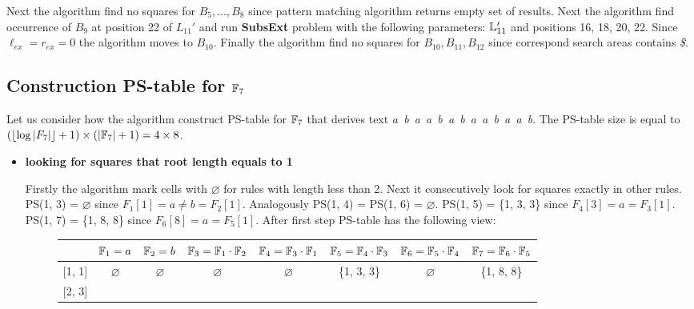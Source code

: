 ﻿\documentclass[11pt]{article}
\begin{document}
\begin{appendix}
\begin{itemize}
  \LeechWordPartitionComplex

  Next the algorithm find no squares for $B_5, \dots, B_8$ since pattern matching algorithm returns empty set of
  results. Next the algorithm find occurrence of $B_9$ at position 22 of $L_{11}'$ and run \textbf{SubsExt}
  problem with the following parameters: $\mathbb{L}_{11}'$ and positions 16, 18, 20, 22. Since $\ell_{ex} = r_{ex} = 0$ the
  algorithm moves to $B_{10}$. Finally the algorithm find no squares for $B_{10}, B_{11}, B_{12}$ since correspond
  search areas contains \emph{\$}.
\end{itemize}

\subsection{Construction PS-table for $\mathbb{F}_7$}

Let us consider how the algorithm construct PS-table for $\mathbb{F}_7$ that derives text \emph{a~b~a~a~b~a~b~a~a~b~a~a~b}.
The PS-table size is equal to $(\lfloor\log |F_7|\rfloor+1)\times (|\mathbb{F}_7|+1) = 4 \times 8$. 

\begin{itemize}
  \item \textbf{looking for squares that root length equals to 1}
  
  Firstly the algorithm mark cells with $\varnothing$ for rules with length less than 2. Next it consecutively look for
  squares exactly in other rules. PS(1, 3) = $\varnothing$ since $F_1[1] = a \neq b = F_2[1]$. Analogously PS(1, 4) =
  PS(1, 6) = $\varnothing$. PS(1, 5) = \{1, 3, 3\} since $F_4[3] = a = F_3[1]$. PS(1, 7) = \{1, 8, 8\} since $F_6[8] = a
  = F_5[1]$. After first step PS-table has the following view: 
  
  \begin{figure}[h]
	  {\footnotesize\noindent
		\begin{tabular}{|c|c|c|c|c|c|c|c|} \hline
	 	& $\mathbb{F}_{1} = a$ & $\mathbb{F}_{2} = b$ & $\mathbb{F}_{3} = \mathbb{F}_{1} \cdot \mathbb{F}_{2}$ & $\mathbb{F}_{4} = \mathbb{F}_{3} \cdot \mathbb{F}_{1}$ &
	 	$\mathbb{F}_{5} = \mathbb{F}_{4} \cdot \mathbb{F}_{3}$ & $\mathbb{F}_{6} = \mathbb{F}_{5} \cdot \mathbb{F}_{4}$ & $\mathbb{F}_{7} = \mathbb{F}_{6} \cdot \mathbb{F}_{5}$ \\ \hline
	
	 	[1, 1] & $\varnothing$ & $\varnothing$ & $\varnothing$ & $\varnothing$ & \{1, 3, 3\} & $\varnothing$ & \{1, 8, 8\} \\
	 	\hline
	
	 	[2, 3] & & & & & & & \\ \hline
	

\end{tabular}}
\end{figure}
\end{itemize}
\end{appendix}
\end{document}
